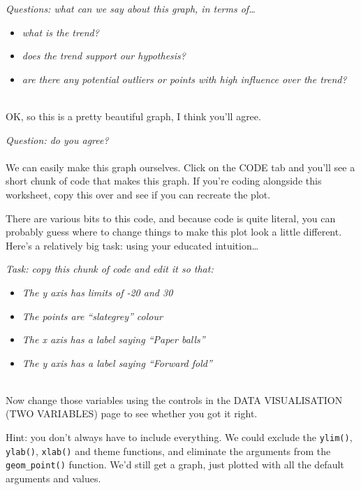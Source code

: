 \documentclass[
]{book}
\providecommand{\tightlist}{%
  \setlength{\itemsep}{0pt}\setlength{\parskip}{0pt}}
\begin{document}
\emph{Questions: what can we say about this graph, in terms of\ldots{}}

\begin{itemize}
\tightlist
\item
  \emph{what is the trend?}
\item
  \emph{does the trend support our hypothesis?}
\item
  \emph{are there any potential outliers or points with high influence over the trend?}\\
  ~\\
\end{itemize}

OK, so this is a pretty beautiful graph, I think you'll agree.

\emph{Question: do you agree?}\\
~\\

We can easily make this graph ourselves. Click on the CODE tab and you'll see a
short chunk of code that makes this graph. If you're coding alongside this worksheet,
copy this over and see if you can recreate the plot.

There are various bits to this code, and because code is quite literal, you can
probably guess where to change things to make this plot look a little different.
Here's a relatively big task: using your educated intuition\ldots{}

\emph{Task: copy this chunk of code and edit it so that:}

\begin{itemize}
\tightlist
\item
  \emph{The y axis has limits of -20 and 30}
\item
  \emph{The points are ``slategrey'' colour}
\item
  \emph{The x axis has a label saying ``Paper balls''}
\item
  \emph{The y axis has a label saying ``Forward fold''}\\
  ~\\
\end{itemize}

Now change those variables using the controls in the DATA VISUALISATION
(TWO VARIABLES) page to see whether you got it right.

Hint: you don't always have to include everything. We could exclude the
\texttt{ylim()}, \texttt{ylab()}, \texttt{xlab()} and theme functions, and eliminate the arguments
from the \texttt{geom\_point()} function. We'd still get a graph, just plotted with all the
default arguments and values.
\end{document}

